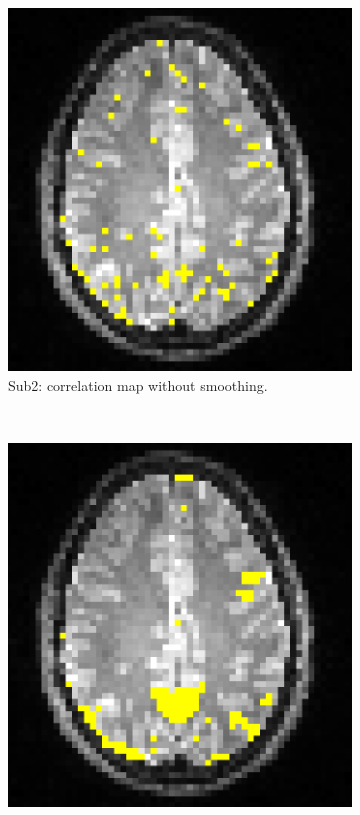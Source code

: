 \begin{figure}[p]
  \begin{subfigure}[t]{0.3\textwidth}
    \centering
    \includegraphics[width=\textwidth]{figures/method1/invivo1/r2}
    \caption{Sub2: correlation map without smoothing.}
    \label{fig:invivo14}
    \end{subfigure}
~
  \begin{subfigure}[t]{0.3\textwidth}
    \centering
    \includegraphics[width=\textwidth]{figures/method1/invivo1/r2_smooth}

\end{subfigure}
\end{figure}
